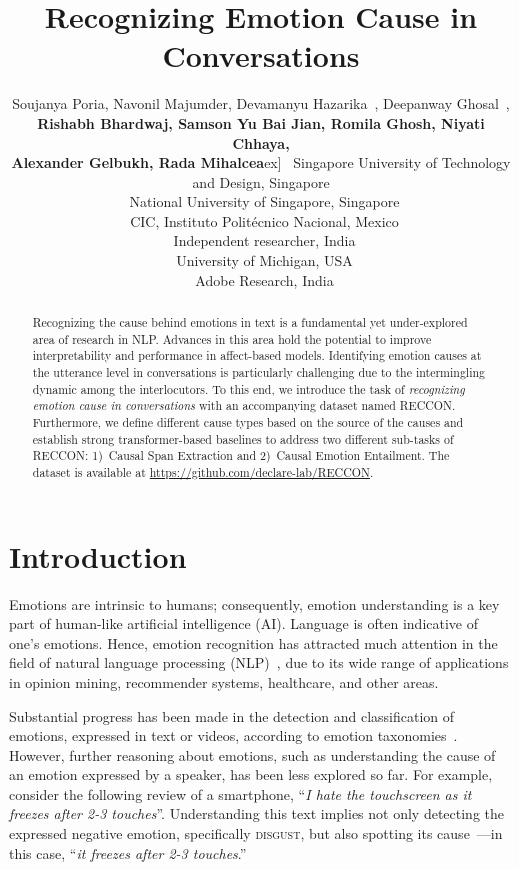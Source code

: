 \documentclass[11pt,a4paper]{article}
\title{Recognizing Emotion Cause in Conversations}
\author{Soujanya Poria, 
Navonil Majumder, Devamanyu
Hazarika\Thanks{~Equal contribution. Randomly ordered.}~,
Deepanway Ghosal\footnotemark[1]~,\\
\textbf{Rishabh Bhardwaj, Samson Yu Bai Jian, Romila Ghosh, Niyati Chhaya,}\\
\textbf{Alexander Gelbukh, Rada Mihalcea}\1ex]
~Singapore University of Technology and Design, Singapore\\
~National University of Singapore, Singapore  \\
~CIC, Instituto Politécnico Nacional, Mexico  \\
~Independent researcher, India\\
~University of Michigan, USA\\
~Adobe Research, India
}
\date{}
\theoremstyle{definition}
\newcommand\emo[1]{\textsc{#1}}
\newcommand\RECCON{\emph{recognizing emotion cause in conversations}}
\newcommand\RECCONDA{RECCON}
\begin{document}
\maketitle
\begin{abstract}
Recognizing the cause behind emotions in text is a fundamental yet under-explored area of research in NLP. Advances in this area hold the potential to improve interpretability and performance in affect-based models. Identifying emotion causes at the utterance level in conversations is particularly challenging due to the intermingling dynamic among the interlocutors. To this end, we introduce the task of \RECCON{} with an accompanying dataset named \RECCONDA. Furthermore, we define different cause types based on the source of the causes and establish strong transformer-based baselines to address two different sub-tasks of RECCON: 1)~Causal Span Extraction and 2)~Causal Emotion Entailment. The dataset is available at \url{https://github.com/declare-lab/RECCON}.

\end{abstract}

\section{Introduction}









Emotions are intrinsic to humans; consequently,
emotion understanding is a key part of human-like artificial
intelligence (AI). Language is
often indicative of one's emotions. Hence, emotion recognition has attracted much attention 
in the field of natural language processing (NLP)~\citep{kratzwald2018decision, colneric2018emotion}, due to its wide range of applications in
opinion mining, recommender systems, healthcare, and other areas.

Substantial progress has been made in the detection and classification of emotions, expressed in text or videos, according to emotion taxonomies~\cite{ekman1993facial,plutchik}. However, further reasoning about emotions, such as  
understanding the cause of an emotion expressed by a speaker,
has been less explored so far.
For example, consider the following review of a smartphone, ``\textit{I hate the touchscreen as it freezes after 2-3 touches}''.
Understanding this text implies not only detecting the expressed negative emotion, specifically \emo{disgust}, but also spotting its cause~\citep{liu2012sentiment}---in this case, ``\textit{it freezes after 2-3 touches}.''
\end{document}
